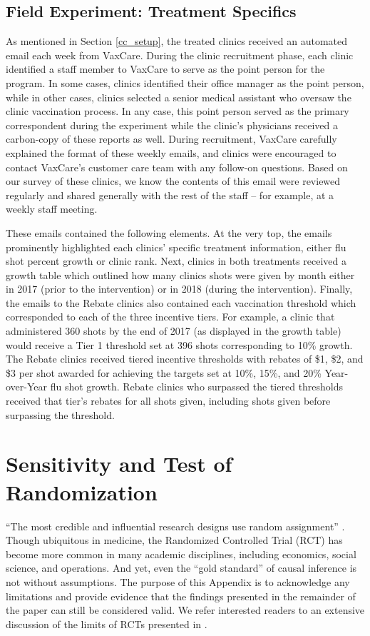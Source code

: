 \subsection{Field Experiment: Treatment Specifics}
As mentioned in Section \ref{cc_setup}, the treated clinics received an automated email each week from VaxCare. During the clinic recruitment phase, each clinic identified a staff member to VaxCare to serve as the point person for the program. In some cases, clinics identified their office manager as the point person, while in other cases, clinics selected a senior medical assistant who oversaw the clinic vaccination process. In any case, this point person served as the primary correspondent during the experiment while the clinic’s physicians received a carbon-copy of these reports as well. During recruitment, VaxCare carefully explained the format of these weekly emails, and clinics were encouraged to contact VaxCare’s customer care team with any follow-on questions. Based on our survey of these clinics, we know the contents of this email were reviewed regularly and shared generally with the rest of the staff – for example, at a weekly staff meeting. 

These emails contained the following elements. At the very top, the emails prominently highlighted each clinics’ specific treatment information, either flu shot percent growth or clinic rank. Next, clinics in both treatments received a growth table which outlined how many clinics shots were given by month either in 2017 (prior to the intervention) or in 2018 (during the intervention). Finally, the emails to the Rebate clinics also contained each vaccination threshold which corresponded to each of the three incentive tiers. For example, a clinic that administered 360 shots by the end of 2017 (as displayed in the growth table) would receive a Tier 1 threshold set at 396 shots corresponding to 10\% growth. The Rebate clinics received tiered incentive thresholds with rebates of \$1, \$2, and \$3 per shot awarded for achieving the targets set at 10\%, 15\%, and 20\% Year-over-Year flu shot growth. Rebate clinics who surpassed the tiered thresholds received that tier’s rebates for all shots given, including shots given before surpassing the threshold.


\section{Sensitivity and Test of Randomization}
“The most credible and influential research designs use random assignment” \citep[p. 11]{Angrist2009}. Though ubiquitous in medicine, the Randomized Controlled Trial (RCT) has become more common in many academic disciplines, including economics, social science, and operations. And yet, even the “gold standard” of causal inference is not without assumptions. The purpose of this Appendix is to acknowledge any limitations and provide evidence that the findings presented in the remainder of the paper can still be considered valid. We refer interested readers to an extensive discussion of the limits of RCTs presented in \cite{Deaton2018}. 

